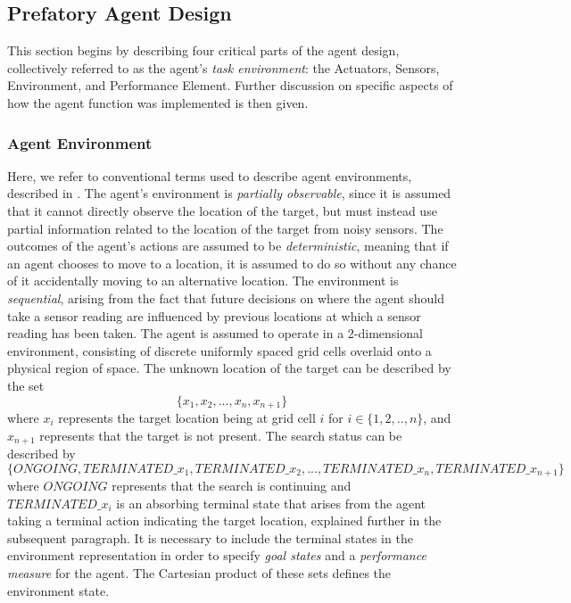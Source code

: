 \subsection{Prefatory Agent Design}\label{subsection:intial_agent_design}

This section begins by describing four critical parts of the agent design, collectively referred to as the agent's \textit{task environment}: the Actuators, Sensors, Environment, and Performance Element. Further discussion on specific aspects of how the agent function was implemented is then given.

\subsubsection{Agent Environment}
Here, we refer to conventional terms used to describe agent environments, described in \cite[p.~41]{AIAMA}. The agent's environment is \textit{partially observable}, since it is assumed that it cannot directly observe the location of the target, but must instead use partial information related to the location of the target from noisy sensors. The outcomes of the agent's actions are assumed to be \textit{deterministic}, meaning that if an agent chooses to move to a location, it is assumed to do so without any chance of it accidentally moving to an alternative location. The environment is \textit{sequential}, arising from the fact that future decisions on where the agent should take a sensor reading are influenced by previous locations at which a sensor reading has been taken. The agent is assumed to operate in a 2-dimensional environment, consisting of discrete uniformly spaced grid cells overlaid onto a physical region of space.
The unknown location of the target can be described by the set
\[\{x_1, x_2, ..., x_n, x_{n+1}\}\]
where $x_i$ represents the target location being at grid cell $i$ for $i \in \{1, 2, .., n\}$, and $x_{n+1}$ represents that the target is not present. The search status can be described by 
\[ \{ONGOING, TERMINATED\_x_1, TERMINATED\_x_2, ..., TERMINATED\_x_n, TERMINATED\_x_{n+1}\} \]
where $ONGOING$ represents that the search is continuing and $TERMINATED\_x_i$ is an absorbing terminal state that arises from the agent taking a terminal action indicating the target location, explained further in the subsequent paragraph. It is necessary to include the terminal states in the environment representation in order to specify \textit{goal states} and a \textit{performance measure} for the agent. The Cartesian product of these sets defines the environment state.

